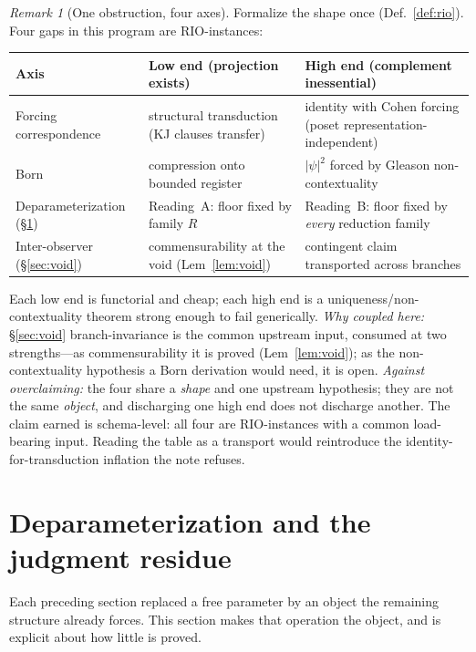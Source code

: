\documentclass[11pt]{article}
\theoremstyle{definition}
\theoremstyle{remark}
\newtheorem*{remark}{Remark}
\begin{document}
\begin{remark}[One obstruction, four axes]
Formalize the shape once (Def.~\ref{def:rio}). Four gaps in this program are RIO-instances:
\begin{center}
\renewcommand{\arraystretch}{1.2}
\begin{tabular}{@{}p{} p{} p{}@{}}
\toprule
\textbf{Axis} & \textbf{Low end (projection exists)} & \textbf{High end (complement inessential)}\\
\midrule
Forcing correspondence & structural transduction (KJ clauses transfer) & identity with Cohen forcing (poset representation-independent)\\
Born & compression onto bounded register & $|\psi|^2$ forced by Gleason non-contextuality\\
Deparameterization (\S\ref{sec:deparam}) & Reading~A: floor fixed by family $R$ & Reading~B: floor fixed by \emph{every} reduction family\\
Inter-observer (\S\ref{sec:void}) & commensurability at the void (Lem~\ref{lem:void}) & contingent claim transported across branches\\
\bottomrule
\end{tabular}
\end{center}
Each low end is functorial and cheap; each high end is a uniqueness/non-contextuality theorem strong
enough to fail generically. \emph{Why coupled here:} \S\ref{sec:void} branch-invariance is the common
upstream input, consumed at two strengths---as commensurability it is proved (Lem~\ref{lem:void}); as
the non-contextuality hypothesis a Born derivation would need, it is open. \emph{Against overclaiming:}
the four share a \emph{shape} and one upstream hypothesis; they are not the same \emph{object}, and
discharging one high end does not discharge another. The claim earned is schema-level: all four are
RIO-instances with a common load-bearing input. Reading the table as a transport would reintroduce the
identity-for-transduction inflation the note refuses.
\end{remark}

\section{Deparameterization and the judgment residue}\label{sec:deparam}

Each preceding section replaced a free parameter by an object the remaining structure already forces.
This section makes that operation the object, and is explicit about how little is proved.
\end{document}
